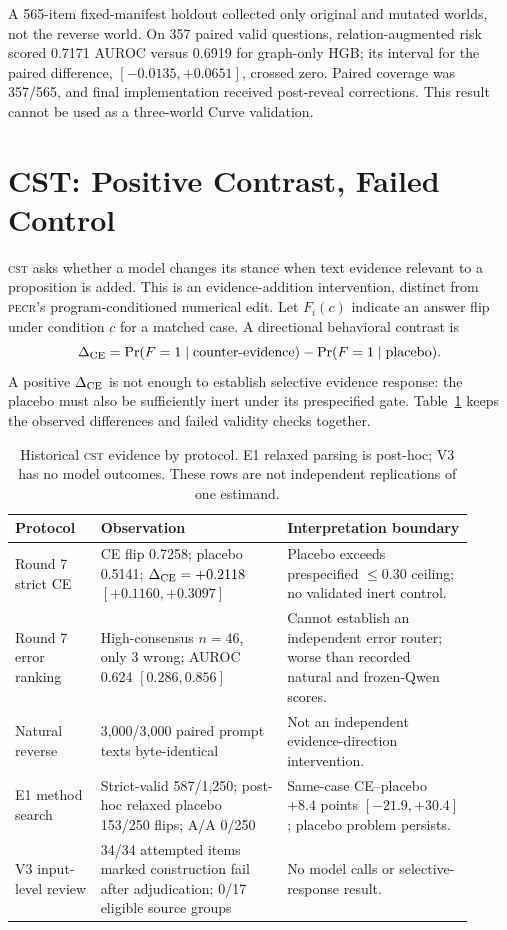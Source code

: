 \documentclass[11pt]{article}
\newcommand{\PECR}{\textsc{pecr}}
\newcommand{\CST}{\textsc{cst}}
\begin{document}
A 565-item fixed-manifest holdout collected only original and mutated worlds, not the reverse world. On 357 paired valid questions, relation-augmented risk scored 0.7171 AUROC versus 0.6919 for graph-only HGB; its interval for the paired difference, $[-0.0135,+0.0651]$, crossed zero. Paired coverage was 357/565, and final implementation received post-reveal corrections. This result cannot be used as a three-world Curve validation.

\section{CST: Positive Contrast, Failed Control}
\CST{} asks whether a model changes its stance when text evidence relevant to a proposition is added. This is an evidence-addition intervention, distinct from \PECR{}'s program-conditioned numerical edit. Let $F_i(c)$ indicate an answer flip under condition $c$ for a matched case. A directional behavioral contrast is
\begin{equation}
\Delta_{\rm CE}=\Pr(F=1\mid \text{counter-evidence})-\Pr(F=1\mid\text{placebo}).
\label{eq:cst}
\end{equation}
A positive $\Delta_{\rm CE}$ is not enough to establish selective evidence response: the placebo must also be sufficiently inert under its prespecified gate. Table~\ref{tab:cst} keeps the observed differences and failed validity checks together.

\begin{table}[t]
\centering
\small
\caption{Historical \CST{} evidence by protocol. E1 relaxed parsing is post-hoc; V3 has no model outcomes. These rows are not independent replications of one estimand.}
\label{tab:cst}
\begin{tabular}{p{0.17\linewidth}p{0.37\linewidth}p{0.37\linewidth}}
\toprule
Protocol & Observation & Interpretation boundary \\
\midrule
Round 7 strict CE & CE flip 0.7258; placebo 0.5141; $\Delta_{\rm CE}=+0.2118$ $[+0.1160,+0.3097]$ & Placebo exceeds prespecified $\leq0.30$ ceiling; no validated inert control. \\
Round 7 error ranking & High-consensus $n=46$, only 3 wrong; AUROC 0.624 $[0.286,0.856]$ & Cannot establish an independent error router; worse than recorded natural and frozen-Qwen scores. \\
Natural reverse & 3,000/3,000 paired prompt texts byte-identical & Not an independent evidence-direction intervention. \\
E1 method search & Strict-valid 587/1,250; post-hoc relaxed placebo 153/250 flips; A/A 0/250 & Same-case CE--placebo $+8.4$ points $[-21.9,+30.4]$; placebo problem persists. \\
V3 input-level review & 34/34 attempted items marked construction fail after adjudication; 0/17 eligible source groups & No model calls or selective-response result. \\
\bottomrule
\end{tabular}
\end{table}
\end{document}
